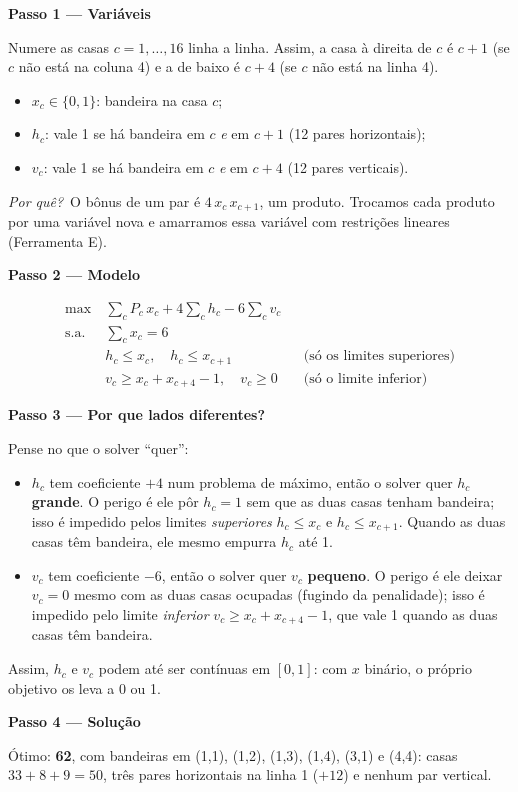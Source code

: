 \documentclass[11pt,a4paper]{article}
\newcommand{\passo}[1]{\par\medskip\textbf{#1}\par}
\newcommand{\porque}{\textit{Por quê?}\ }
\begin{document}
\passo{Passo 1 --- Variáveis}
Numere as casas $c=1,\dots,16$ linha a linha. Assim, a casa à direita de $c$ é $c+1$ (se $c$ não está na coluna 4) e a de baixo é
$c+4$ (se $c$ não está na linha 4).
\begin{itemize}
  \item $x_c\in\{0,1\}$: bandeira na casa $c$;
  \item $h_c$: vale 1 se há bandeira em $c$ \emph{e} em $c+1$ (12 pares horizontais);
  \item $v_c$: vale 1 se há bandeira em $c$ \emph{e} em $c+4$ (12 pares verticais).
\end{itemize}
\porque O bônus de um par é $4\,x_c\,x_{c+1}$, um produto. Trocamos cada produto por uma variável nova e
amarramos essa variável com restrições lineares (Ferramenta E).

\passo{Passo 2 --- Modelo}
\begin{align*}
  \max\ & \sum_c P_c\,x_c + 4\sum_c h_c - 6\sum_c v_c\\
  \text{s.a.}\ & \sum_c x_c = 6\\
  & h_c \le x_c, \quad h_c \le x_{c+1} && \text{(só os limites superiores)}\\
  & v_c \ge x_c + x_{c+4} - 1, \quad v_c \ge 0 && \text{(só o limite inferior)}
\end{align*}

\passo{Passo 3 --- Por que lados diferentes?}
Pense no que o solver ``quer'':
\begin{itemize}
  \item $h_c$ tem coeficiente $+4$ num problema de máximo, então o solver quer $h_c$ \textbf{grande}. O perigo é ele pôr
        $h_c=1$ sem que as duas casas tenham bandeira; isso é impedido pelos limites \emph{superiores}
        $h_c\le x_c$ e $h_c\le x_{c+1}$. Quando as duas casas têm bandeira, ele mesmo empurra $h_c$ até 1.
  \item $v_c$ tem coeficiente $-6$, então o solver quer $v_c$ \textbf{pequeno}. O perigo é ele deixar $v_c=0$ mesmo
        com as duas casas ocupadas (fugindo da penalidade); isso é impedido pelo limite \emph{inferior}
        $v_c\ge x_c+x_{c+4}-1$, que vale 1 quando as duas casas têm bandeira.
\end{itemize}
Assim, $h_c$ e $v_c$ podem até ser contínuas em $[0,1]$: com $x$ binário, o próprio objetivo os leva a 0 ou 1.

\passo{Passo 4 --- Solução}
Ótimo: \textbf{62}, com bandeiras em (1,1), (1,2), (1,3), (1,4), (3,1) e (4,4): casas $33+8+9=50$, três pares horizontais
na linha 1 ($+12$) e nenhum par vertical.
\end{document}
